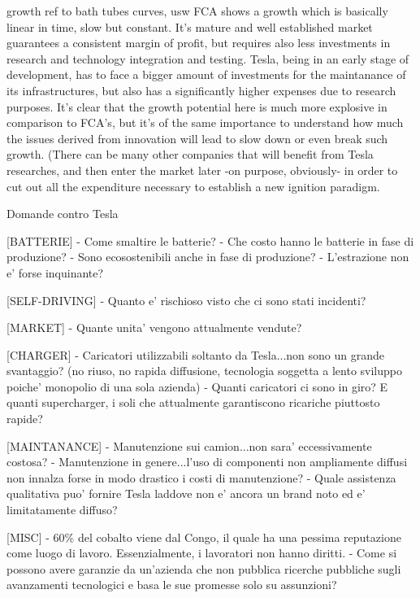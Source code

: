 growth
    {ref to bath tubes curves, usw} FCA shows a growth which is basically linear in time, slow but constant. It's mature and well established market guarantees a consistent margin of profit, but requires also less investments in research and technology integration and testing. Tesla, being in an early stage of development, has to face a bigger amount of investments for the maintanance of its infrastructures, but also has a significantly higher expenses due to research purposes. It's clear that the growth potential here is much more explosive in comparison to FCA's, but it's of the same importance to understand how much the issues derived from innovation will lead to slow down or even break such growth. (There can be many other companies that will benefit from Tesla researches, and then enter the market later -on purpose, obviously- in order to cut out all the expenditure necessary to establish a new ignition paradigm. 


Domande contro Tesla

[BATTERIE]
    - Come smaltire le batterie?
    - Che costo hanno le batterie in fase di produzione? 
    - Sono ecosostenibili anche in fase di produzione?
    - L'estrazione non e' forse inquinante?

[SELF-DRIVING]
    - Quanto e' rischioso visto che ci sono stati incidenti?
    
[MARKET]
    - Quante unita' vengono attualmente vendute?
    
[CHARGER]
    - Caricatori utilizzabili soltanto da Tesla...non sono un grande svantaggio? (no riuso, no rapida diffusione, tecnologia soggetta a lento sviluppo poiche' monopolio di una sola azienda)
    - Quanti caricatori ci sono in giro? E quanti supercharger, i soli che attualmente garantiscono ricariche piuttosto rapide?
    
[MAINTANANCE]
    - Manutenzione sui camion...non sara' eccessivamente costosa?
    - Manutenzione in genere...l'uso di componenti non ampliamente diffusi non innalza forse in modo drastico i costi di manutenzione?
    - Quale assistenza qualitativa puo' fornire Tesla laddove non e' ancora un brand noto ed e' limitatamente diffuso?
    
[MISC]
    - 60\% del cobalto viene dal Congo, il quale ha una pessima reputazione come luogo di lavoro. Essenzialmente, i lavoratori non hanno diritti.
    - Come si possono avere garanzie da un'azienda che non pubblica ricerche pubbliche sugli avanzamenti tecnologici e basa le sue promesse solo su assunzioni?
  

